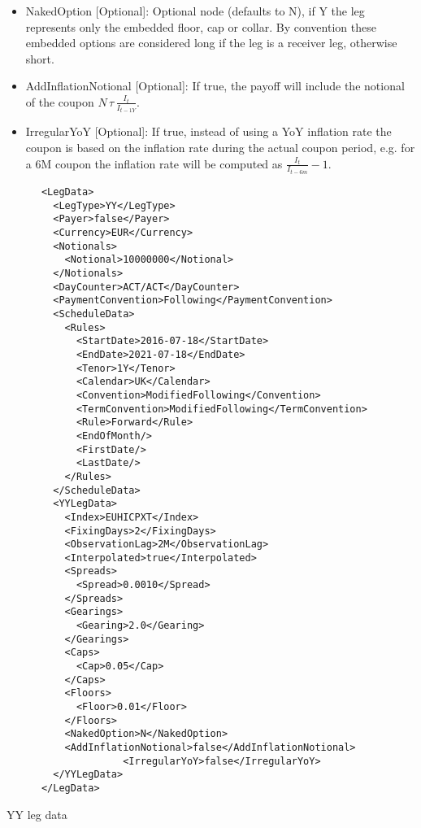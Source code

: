 \begin{itemize}
\item NakedOption [Optional]: Optional node (defaults to N), if Y the leg represents only the embedded floor, cap or collar. By convention these embedded options are considered long if the leg is a receiver leg, otherwise short. 

\item AddInflationNotional [Optional]: If true, the payoff will include the notional of the coupon $N \, \tau \, \frac{I_t}{I_{t-1Y}}$.

\item IrregularYoY [Optional]: If true, instead of using a YoY inflation rate the coupon is based on the inflation rate during the actual coupon period, e.g.  for a 6M coupon the inflation rate will be computed as $\frac{I_t}{I_{t-6m}}-1$.  
\end{itemize}

\begin{listing}[H]
\begin{verbatim}
      <LegData>
        <LegType>YY</LegType>
        <Payer>false</Payer>
        <Currency>EUR</Currency>
        <Notionals>
          <Notional>10000000</Notional>
        </Notionals>
        <DayCounter>ACT/ACT</DayCounter>
        <PaymentConvention>Following</PaymentConvention>
        <ScheduleData>
          <Rules>
            <StartDate>2016-07-18</StartDate>
            <EndDate>2021-07-18</EndDate>
            <Tenor>1Y</Tenor>
            <Calendar>UK</Calendar>
            <Convention>ModifiedFollowing</Convention>
            <TermConvention>ModifiedFollowing</TermConvention>
            <Rule>Forward</Rule>
            <EndOfMonth/>
            <FirstDate/>
            <LastDate/>
          </Rules>
        </ScheduleData>
        <YYLegData>
          <Index>EUHICPXT</Index>
          <FixingDays>2</FixingDays>
          <ObservationLag>2M</ObservationLag>
          <Interpolated>true</Interpolated>
          <Spreads>
            <Spread>0.0010</Spread>
          </Spreads>
          <Gearings>
            <Gearing>2.0</Gearing>
          </Gearings>
          <Caps>
            <Cap>0.05</Cap>
          </Caps>
          <Floors>
            <Floor>0.01</Floor>
          </Floors>
          <NakedOption>N</NakedOption>
          <AddInflationNotional>false</AddInflationNotional>
					<IrregularYoY>false</IrregularYoY>
        </YYLegData>
      </LegData>
\end{verbatim}
\caption{YY leg data}
\label{lst:yylegdata}
\end{listing}
